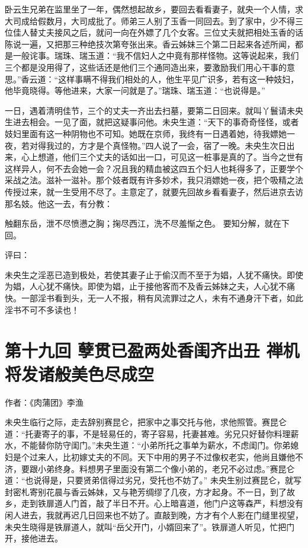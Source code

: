 \documentclass[a4paper,12pt,UTF8,twoside]{ctexbook}
\begin{document}
卧云生兄弟在监里坐了一年，偶然想起故乡，要回去看看妻子，就央一个人情，求大司成给假数月，大司成批了。师弟三人别了玉香一同回去。到了家中，少不得三位佳人替丈夫接风之后，就问一向在外嫖了几个女客。三位丈夫就把相处玉香的话陈说一遍，又把那三种绝技次第夸张出来。香云姊妹三个第二日起来各述所闻，都是一般诧事。瑞珠、瑞玉道：“我不信妇人之中竟有那样怪物。这等说起来，我们三个都是没用得了，这些话还是他们三个通同造出来，要激励我们用心干事的意思。”香云道：“这样事瞒不得我们相处的人，他生平见广识多，若有这一种妓妇，他毕竟晓得。等他进来，大家一问就是了。”瑞珠、瑞玉道：“也说得是。”

一日，遇着清明佳节，三个的丈夫一齐出去扫墓，要第二日回来。就叫丫鬟请未央生进去相会。一见了面，就把这疑事问他。未央生道：“天下的事奇奇怪怪，或者妓妇里面有这一种阴物也不可知。她既在京师，我终有一日遇着她，待我嫖她一夜，若对得我过的，方才是个真怪物。”四人说了一会，宿了一晚。未央生次日出来，心上想道，他们三个丈夫的话如出一口，可见这一桩事是真的了。当今之世有这样异人，何不去会她一会？况且我的精血被这四五个妇人也耗得多了，正要学个采战之法。滋补一滋补。那个妓者既有许多妙术，我只消嫖她一夜，把个吸精之法传授过来，就一生受用不尽了。主意定了，就要先回故乡看看妻子，然后进京去访那名妓。他这一去，有分教：

触翻东岳，泄不尽愤懑之胸；掬尽西江，洗不尽羞惭之色。
要知分解，就在下回。

评曰：

未央生之淫恶已造到极处，若使其妻子止于偷汉而不至于为娼，人犹不痛快。即使为娼，人心犹不痛快。即使为娼，止于接他客而不及香云姊妹之夫，人心犹不痛快。一部淫书看到头，无一人不报，稍有风流罪过之人，未有不通身汗下者，如此淫书不可不多读也！

\chapter{第十九回 孽贯已盈两处香闺齐出丑 禅机将发诸般美色尽成空}

作者：《肉蒲团》李渔

未央生临行之际，走去辞别赛昆仑，把家中之事交托与他，求他照管。赛昆仑道：“托妻寄子的事，不是轻易任的，寄子容易，托妻甚难。劣兄只好替你料理薪水，不能替你防守闺门。”未央生道：“小弟所托之事单为薪水，不虑闺门。你弟媳妇是个过来人，比初嫁丈夫的不同。天下中用的男子不过像权老实，他尚且嫌他不济，要跟小弟终身。料想男子里面没有第二个像小弟的，老兄不必过虑。”赛昆仑道：“也说得是，只要贤弟信得过劣兄，受托也不妨了。” 未央生别过赛昆仑，就写封密札寄别花晨与香云姊妹，又与艳芳绸缪了几夜，方才起身。不一日，到了故乡，走到铁扉道人门首，敲了半日不开。心上暗喜道，他门户这等森严，料想没有闲人进去，我就再迟几日回来也不妨了。直敲到晚，方才有个人影在门缝里视望，未央生晓得是铁扉道人，就叫“岳父开门，小婿回来了”。铁扉道人听见，忙把门开，接他进去。
\end{document}
